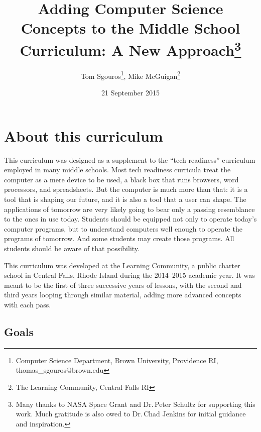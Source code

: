 \documentclass[11pt]{article}
\begin{document}
\title{Adding Computer Science Concepts to the Middle School
  Curriculum: A New Approach\thanks{Many thanks to NASA Space Grant
    and Dr.\,Peter Schultz for supporting this work.  Much gratitude
    is also owed to Dr.\,Chad Jenkins for initial guidance and
    inspiration.}}  \author{Tom Sgouros\footnote{Computer Science
    Department, Brown University, Providence RI,
    thomas\_sgouros@brown.edu}, Mike McGuigan\footnote{The Learning
    Community, Central Falls RI}} \date{21 September 2015}
\maketitle

\bgroup
\sffamily
\tableofcontents
\egroup

\setlength{\parskip}{\baselineskip}
\setlength{\parindent}{0pt}

\section{About this curriculum}

This curriculum was designed as a supplement to the ``tech readiness''
curriculum employed in many middle schools.  Most tech readiness curricula
treat the computer as a mere device to be used, a black box that runs
browsers, word processors, and spreadsheets.  But the computer is much
more than that: it is a tool that is shaping our future, and it is
also a tool that a user can shape.  The applications of tomorrow are
very likely going to bear only a passing resemblance to the ones in
use today.  Students should be equipped not only to operate today's
computer programs, but to understand computers well enough to operate
the programs of tomorrow.  And some students may create those
programs.  All students should be aware of that possibility.

This curriculum was developed at the Learning Community, a public
charter school in Central Falls, Rhode Island during the 2014--2015
academic year.  It was meant to be the first of three successive years
of lessons, with the second and third years looping through similar
material, adding more advanced concepts with each pass.

\subsection{Goals}
\end{document}

